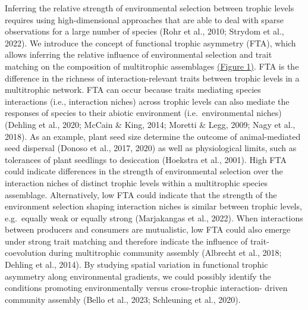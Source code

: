 \documentclass[
]{agujournal2019}
\begin{document}
Inferring the relative strength of environmental selection between
trophic levels requires using high-dimensional approaches that are able
to deal with sparse observations for a large number of species (Rohr et
al., 2010; Strydom et al., 2022). We introduce the concept of functional
trophic asymmetry (FTA), which allows inferring the relative influence
of environmental selection and trait matching on the composition of
multitrophic assemblages \href{Figure\%201}{(Figure 1)}. FTA is the
difference in the richness of interaction-relevant traits between
trophic levels in a multitrophic network. FTA can occur because traits
mediating species interactions (i.e., interaction niches) across trophic
levels can also mediate the responses of species to their abiotic
environment (i.e.~environmental niches) (Dehling et al., 2020; McCain \&
King, 2014; Moretti \& Legg, 2009; Nagy et al., 2018). As an example,
plant seed size determine the outcome of animal-mediated seed dispersal
(Donoso et al., 2017, 2020) as well as physiological limits, such as
tolerances of plant seedlings to desiccation (Hoekstra et al., 2001).
High FTA could indicate differences in the strength of environmental
selection over the interaction niches of distinct trophic levels within
a multitrophic species assemblage. Alternatively, low FTA could indicate
that the strength of the environment selection shaping interaction
niches is similar between trophic levels, e.g.~equally weak or equally
strong (Marjakangas et al., 2022). When interactions between producers
and consumers are mutualistic, low FTA could also emerge under strong
trait matching and therefore indicate the influence of trait-coevolution
during multitrophic community assembly (Albrecht et al., 2018; Dehling
et al., 2014). By studying spatial variation in functional trophic
asymmetry along environmental gradients, we could possibly identify the
conditions promoting environmentally versus cross-trophic interaction-
driven community assembly (Bello et al., 2023; Schleuning et al., 2020).
\end{document}
